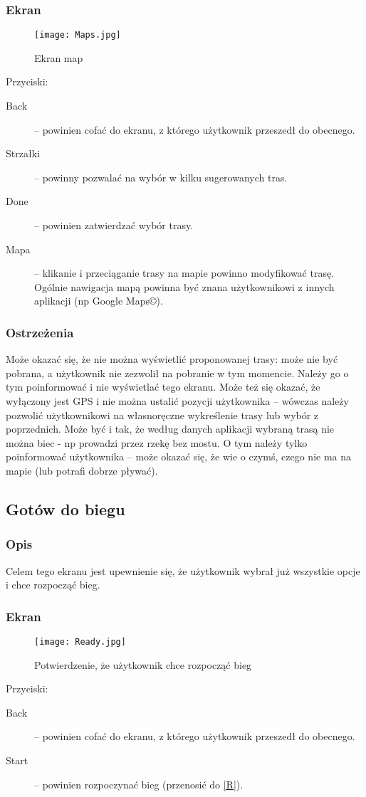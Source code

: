 \subsubsection{Ekran}
\begin{figure}[b!]
  \texttt{[image: Maps.jpg]}
  \caption{Ekran map}
  \label{M}
\end{figure}
Przyciski:\\
\begin{description}
  \item[Back] -- powinien cofać do ekranu, z którego użytkownik przeszedł do obecnego.
  \item[Strzałki] -- powinny pozwalać na wybór w kilku sugerowanych tras.
  \item[Done] -- powinien zatwierdzać wybór trasy.
  \item[Mapa] -- klikanie i przeciąganie trasy na mapie powinno modyfikować trasę. Ogólnie nawigacja mapą powinna być znana użytkownikowi z innych aplikacji (np Google Maps©).
\end{description}
\subsubsection{Ostrzeżenia}
\noindent Może okazać się, że nie można wyświetlić proponowanej trasy: może nie być pobrana, a użytkownik nie zezwolił na pobranie w tym momencie. Należy go o tym poinformować i nie wyświetlać tego ekranu. Może też się okazać, że wyłączony jest GPS i nie można ustalić pozycji użytkownika -- wówczas należy pozwolić użytkownikowi na własnoręczne wykreślenie trasy lub wybór z poprzednich. Może być i tak, że według danych aplikacji wybraną trasą nie można biec - np prowadzi przez rzekę bez mostu. O tym należy tylko poinformować użytkownika -- może okazać się, że wie o czymś, czego nie ma na mapie (lub potrafi dobrze pływać).
\subsection{Gotów do biegu}
\subsubsection{Opis}
\noindent Celem tego ekranu jest upewnienie się, że użytkownik wybrał już wszystkie opcje i chce rozpocząć bieg. 
\subsubsection{Ekran}
\begin{figure}[b!]
  \texttt{[image: Ready.jpg]}
  \caption{Potwierdzenie, że użytkownik chce rozpocząć bieg}
  \label{RR}
\end{figure}
Przyciski:\\
\begin{description}
  \item[Back] -- powinien cofać do ekranu, z którego użytkownik przeszedł do obecnego.
  \item[Start] -- powinien rozpoczynać bieg (przenosić do \ref{R}).
\end{description}
